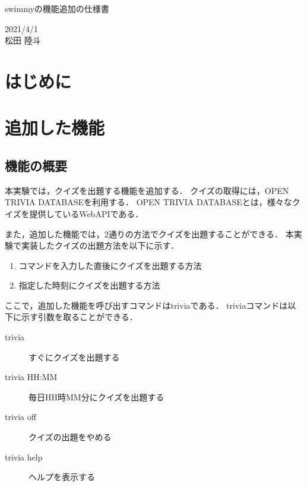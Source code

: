 \documentclass[12pt]{jsarticle}
\begin{document}
\begin{center}
{\LARGE swimmyの機能追加の仕様書}
\end{center}

\begin{flushright}
  2021/4/1\\
  松田 陸斗
\end{flushright}
\section{はじめに}
\label{sec:introduction}

\section{追加した機能}
\label{sec:add_function}
\subsection{機能の概要}
本実験では，クイズを出題する機能を追加する．
クイズの取得には，OPEN TRIVIA DATABASE\cite{trivia}を利用する．
OPEN TRIVIA DATABASEとは，様々なクイズを提供しているWebAPIである．

また，追加した機能では，2通りの方法でクイズを出題することができる．
本実験で実装したクイズの出題方法を以下に示す．
\begin{enumerate}
  \item コマンドを入力した直後にクイズを出題する方法
  \item 指定した時刻にクイズを出題する方法
\end{enumerate}
ここで，追加した機能を呼び出すコマンドはtriviaである．
triviaコマンドは以下に示す引数を取ることができる．
\begin{description}
  \item[trivia] すぐにクイズを出題する
  \item[trivia HH:MM] 毎日HH時MM分にクイズを出題する
  \item[trivia off] クイズの出題をやめる
  \item[trivia help] ヘルプを表示する
\end{description}
\end{document}
